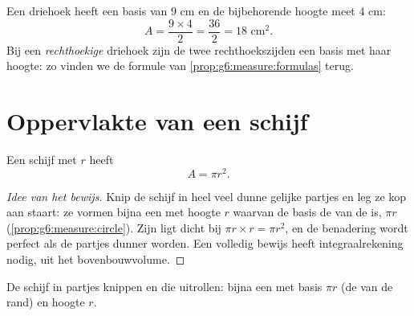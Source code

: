 \begin{example}\label{ex:g7:areas:triangle}
Een driehoek heeft een basis van $9$ cm en de bijbehorende hoogte meet $4$ cm:
\[
A = \frac{9 \times 4}{2} = \frac{36}{2} = 18 \text{ cm}^2 .
\]
Bij een \emph{rechthoekige} driehoek zijn de twee rechthoekszijden een basis met haar
hoogte: zo vinden we de formule van \cref{prop:g6:measure:formulas} terug.
\end{example}

\section{Oppervlakte van een schijf}

\begin{theorem}[Schijf]\label{thm:g7:areas:disk}
Een schijf met  $r$ heeft 
\[
A = \pi r^2 .
\]
\end{theorem}

\begin{proof}[Idee van het bewijs]
Knip de schijf in heel veel dunne gelijke partjes en leg ze kop aan staart: ze vormen
bijna een  met hoogte $r$ waarvan de basis de  van de  is,
$\pi r$ (\cref{prop:g6:measure:circle}). Zijn  ligt dicht bij
$\pi r \times r = \pi r^2$, en de benadering wordt perfect als de partjes dunner
worden. Een volledig bewijs heeft integraalrekening nodig, uit het bovenbouwvolume.
\end{proof}

\begin{omfigure}

{\small De schijf in partjes knippen en die uitrollen: bijna een  met
basis $\pi r$ (de  van de rand) en hoogte $r$.}
\end{omfigure}

